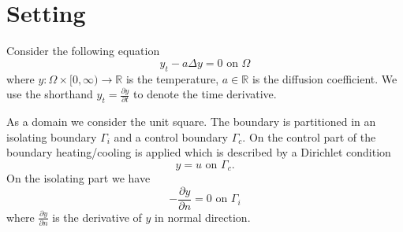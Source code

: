 \documentclass[
12pt, %
a4paper, %
onecolumn, %
portrait %
]{article}
\begin{document}
\pagestyle{myheadings} %
\markright{\doctitle} %


\thispagestyle{plain} %

\printtitle %

\section{Setting}
Consider the following equation
\begin{equation}
y_t -  a \Delta y = 0 \text{ on } \Omega
\label{eq:pde}
\end{equation}
where $y : \Omega \times [0, \infty) \rightarrow \mathbb{R}$ is the temperature, $a \in \mathbb{R}$ is the diffusion coefficient. We use the shorthand $y_t = \frac{\partial y}{\partial t}$ to denote the time derivative.
 
As a domain we consider the unit square. The boundary is partitioned in an isolating boundary $\Gamma_i$ and a control boundary $\Gamma_c$.
On the control part of the boundary heating/cooling is applied which is described by a Dirichlet condition
\begin{equation}
y = u \text{ on } \Gamma_c.
\end{equation}
On the isolating part we have
\begin{equation}
- \frac{\partial y}{\partial n} = 0 \text{ on } \Gamma_i
\end{equation}
where $\frac{\partial y}{\partial n}$ is the derivative of $y$ in normal direction.

\begin{center}
\end{center}
\end{document}
